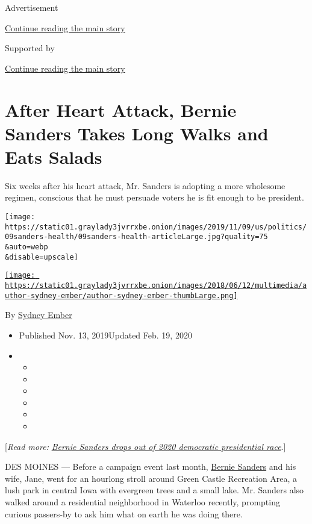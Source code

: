 Advertisement

\protect\hyperlink{after-top}{Continue reading the main story}

Supported by

\protect\hyperlink{after-sponsor}{Continue reading the main story}

\hypertarget{after-heart-attack-bernie-sanders-takes-long-walks-and-eats-salads}{%
\section{After Heart Attack, Bernie Sanders Takes Long Walks and Eats
Salads}\label{after-heart-attack-bernie-sanders-takes-long-walks-and-eats-salads}}

Six weeks after his heart attack, Mr. Sanders is adopting a more
wholesome regimen, conscious that he must persuade voters he is fit
enough to be president.

\texttt{[image: https://static01.graylady3jvrrxbe.onion/images/2019/11/09/us/politics/09sanders-health/09sanders-health-articleLarge.jpg?quality=75\\\&auto=webp\\\&disable=upscale]}

\href{https://www.nytimes3xbfgragh.onion/by/sydney-ember}{\texttt{[image: https://static01.graylady3jvrrxbe.onion/images/2018/06/12/multimedia/author-sydney-ember/author-sydney-ember-thumbLarge.png]}}

By \href{https://www.nytimes3xbfgragh.onion/by/sydney-ember}{Sydney
Ember}

\begin{itemize}
\item
  Published Nov. 13, 2019Updated Feb. 19, 2020
\item
  \begin{itemize}
  \item
  \item
  \item
  \item
  \item
  \item
  \end{itemize}
\end{itemize}

{[}\emph{Read more:}
\href{https://www.nytimes3xbfgragh.onion/2020/04/08/us/politics/bernie-sanders-drops-out.html}{\emph{Bernie
Sanders drops out of 2020 democratic presidential race}}.{]}

DES MOINES --- Before a campaign event last month,
\href{https://www.nytimes3xbfgragh.onion/2019/12/06/podcasts/the-daily/bernie-sanders.html}{Bernie
Sanders} and his wife, Jane, went for an hourlong stroll around Green
Castle Recreation Area, a lush park in central Iowa with evergreen trees
and a small lake. Mr. Sanders also walked around a residential
neighborhood in Waterloo recently, prompting curious passers-by to ask
him what on earth he was doing there.


